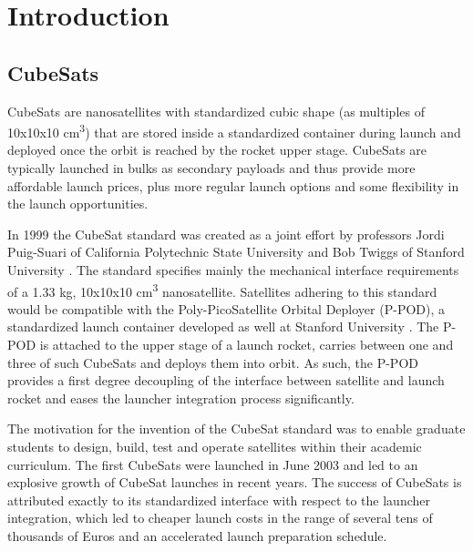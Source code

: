 \chapter{Introduction}

\section{CubeSats}

CubeSats are nanosatellites with standardized cubic shape (as multiples of 10x10x10 cm\textsuperscript{3}) that are stored inside a standardized container during launch and deployed once the orbit is reached by the rocket upper stage. CubeSats are typically launched in bulks as secondary payloads and thus provide more affordable launch prices, plus more regular launch options and some flexibility in the launch opportunities.

In 1999 the CubeSat standard was created as a joint effort by professors Jordi Puig-Suari of California Polytechnic State University and Bob Twiggs of Stanford University \cite{heidt2000cubesat}. The standard specifies mainly the mechanical interface requirements of a 1.33 kg, 10x10x10 cm\textsuperscript{3} nanosatellite. Satellites adhering to this standard would be compatible with the Poly-PicoSatellite Orbital Deployer (P-POD), a standardized launch container developed as well at Stanford University \cite{nason2002development}. The P-POD is attached to the upper stage of a launch rocket, carries between one and three of such CubeSats and deploys them into orbit. As such, the P-POD provides a first degree decoupling of the interface between satellite and launch rocket and eases the launcher integration process significantly.

The motivation for the invention of the CubeSat standard was to enable graduate students to design, build, test and operate satellites within their academic curriculum. The first CubeSats were launched in June 2003 and led to an explosive growth of CubeSat launches in recent years. The success of CubeSats is attributed exactly to its standardized interface with respect to the launcher integration, which led to cheaper launch costs in the range of several tens of thousands of Euros and an accelerated launch preparation schedule.

